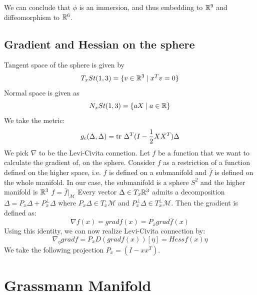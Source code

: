 \documentclass[11pt,a4paper]{report}
\begin{document}
\noindent We can conclude that $\phi$ is an immersion, and thus embedding to $\mathbb{R}^9$ and diffeomorphism to $\mathbb{R}^6$.

\section{Gradient and Hessian on the sphere}

Tangent space of the sphere is given by 
$$ T_x St(1,3) = \{ v \in \mathbb{R}^3 \; | \; x^T v = 0 \} $$
Normal space is given as
$$ N_xSt(1,3) = \{ a X \; | \; a \in \mathbb{R} \} $$
We take the metric:
$$ g_c(\Delta,\Delta) = \textrm{tr } \Delta^T (I - \frac{1}{2} X X^T ) \Delta  $$
We pick $\nabla$ to be the Levi-Civita connetion.
\newline
Let $f$ be a function that we want to calculate the gradient of, on the sphere.
Consider $f$ as a restriction of a function defined on the higher space, i.e. $f$ is defined on a submanifold and $\bar{f}$ is defined on the whole manifold.
In our case, the submanifold is a sphere $S^2$ and the higher manifold is $\mathbb{R}^3$
$f = \bar{f}|_{\mathcal{M}}$
Every vector $\Delta \in T_x \mathbb{R}^3$ admits a decomposition $\Delta = P_{x}\Delta + P_{x}^{\perp} \Delta$ where 
$ P_x \Delta \in T_{x} \mathcal{M} $ and $P_{x}^{\perp} \Delta \in T_{x}^{\perp} \mathcal{M}$.
Then the gradient is defined as:
$$\nabla f (x) =  grad f(x) = P_{x} grad \bar{f} (x) $$
Using this identity, we can now realize Levi-Civita connection by:
$$ \nabla_{\eta} grad f = P_{x} D (grad f(x))[\eta] = Hess f(x) \eta $$
We take the following projection $P_x = (I - xx^T)$.


\chapter{Grassmann Manifold}\label{GrassChapter}
\end{document}

